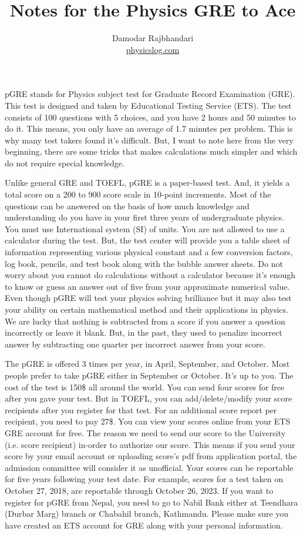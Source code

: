 \documentclass[12pt,a4paper]{article}
\title{Notes for the Physics GRE to Ace} %
\author{Damodar Rajbhandari\\ \href{https://www.physicslog.com}{physicslog.com}} %
\begin{document}
\maketitle %

pGRE stands for Physics subject test for Graduate Record Examination (GRE). This test is designed and taken by Educational Testing Service (ETS). The test consists of 100 questions with 5 choices, and you have 2 hours and 50 minutes to do it. This means, you only have an average of 1.7 minutes per problem. This is why many test takers found it's difficult. But, I want to note here from the very beginning, there are some tricks that makes calculations much simpler and which do not require special knowledge. 

Unlike general GRE and TOEFL, pGRE is a paper-based test. And, it yields a total score on a 200 to 900 score scale in 10-point increments. Most of the questions can be answered on the basis of how much knowledge and understanding  do you have in your first three years of undergraduate physics. You must use International system (SI) of units. You are not allowed to use a calculator during the test. But, the test center will provide you a table sheet of information representing various physical constant and a few conversion factors, log book, pencils, and test book along with the bubble answer sheets. Do not worry about you cannot do calculations without a calculator because it's enough to know or guess an answer out of five from your approximate numerical value. Even though pGRE will test your physics solving brilliance but it may also test your ability on certain mathematical method and their applications in physics.  We are lucky that nothing is subtracted from a score if you answer a question incorrectly or leave it blank. But, in the past, they used to penalize incorrect answer by subtracting one quarter per incorrect answer from your score.

The pGRE is offered 3 times per year, in April, September, and October. Most people prefer to take pGRE either in September or October. It's up to you. The cost of the test is 150\$ all around the world. You can send four scores for free after you gave your test. But in TOEFL, you can add/delete/modify your score recipients after you register for that test. For an additional score report per recipient, you need to pay 27\$. You can view your scores online from your ETS GRE account for free. The reason we need to send our score to the University (i.e. score recipient) in-order to authorize our score. This means if you send your score by your email account or uploading score's pdf from application portal, the admission committee will consider it as unofficial. Your scores can be reportable for five years following your test date. For example, scores for a test taken on October 27, 2018, are reportable through October 26, 2023. If you want to register for pGRE from Nepal, you need to go to Nabil Bank either at Teendhara (Durbar Marg) branch or Chabahil branch, Kathmandu. Please make sure you have created an ETS account for GRE along with your personal information.
\end{document}
